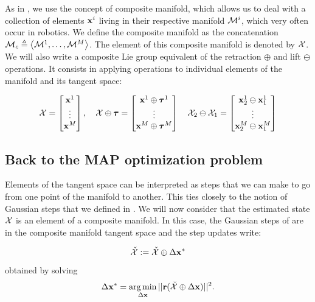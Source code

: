 As in \cite{sola2018micro}, we use the concept of composite manifold, which allows us to deal with a collection of elements ${\bf x}^i$ living in their respective manifold $\mathcal{M}^i$, which very often occur in robotics. We define the composite manifold as the concatenation $\mathcal{M}_c \triangleq \left<\mathcal{M}^1, \dots, \mathcal{M}^M \right>$. The element of this composite manifold is denoted by $\mathcal{X}$.
We will also write a composite Lie group  equivalent of the retraction $\oplus$ and 
lift $\ominus$ operations. It consists in applying operations to individual elements of the manifold and its tangent space:

\begin{equation}
    \mathcal{X}=
    \begin{bmatrix}
        {\bf x}^1 \\
        \vdots \\
        {\bf x}^M
    \end{bmatrix},
    \quad
    \mathcal{X} \oplus {\bm \tau}
    =
    \begin{bmatrix}
        {\bf x}^1 \oplus {\bm \tau}^1 \\
        \vdots \\
        {\bf x}^M \oplus {\bm \tau}^M
    \end{bmatrix}
    \quad
    \mathcal{X}_2 \ominus \mathcal{X}_1
    =
    \begin{bmatrix}
        {\bf x}^1_2 \ominus {\bf x}^1_1 \\
        \vdots \\
        {\bf x}^M_2 \ominus {\bf x}^M_1
    \end{bmatrix}
    \label{eq:composite_retract}
\end{equation}



\subsection{Back to the MAP optimization problem}
\label{sec:manifold_GN}
Elements of the tangent space can be interpreted as steps that we can make to go from one point of the manifold to another.
This ties closely to the notion of Gaussian steps that we defined in . We will now consider that the estimated state $\mathcal{X}$
is an element of a composite manifold. In this case, the Gaussian steps of 
are in the composite manifold tangent space and the step updates write:

\begin{equation}
    \check{\mathcal{X}} := \check{\mathcal{X}} \oplus \Delta {\bf x}^*
\end{equation}
%
obtained by solving
%
\begin{equation}
    \Delta {\bf x}^* = \operatorname*{arg\,min}_{\Delta {\bf x}} ||{\bf r}(\check{\mathcal{X}} \oplus \Delta {\bf x})||^2.
\end{equation}


